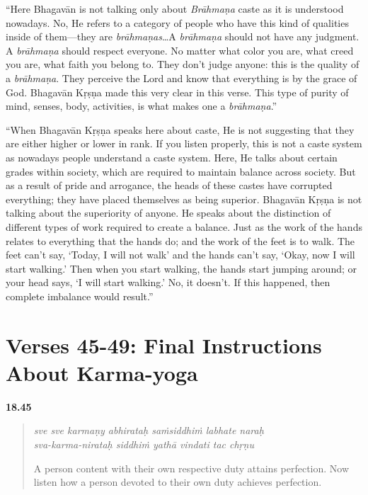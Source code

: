 \enquote{Here Bhagavān is not talking only about \textit{Brāhmaṇa} caste as it is understood nowadays. No, He refers to a category of people who have this kind of qualities inside of them---they are \textit{brāhmaṇas}\ldots A \textit{brāhmaṇa} should not have any judgment. A \textit{brāhmaṇa} should respect everyone. No matter what color you are, what creed you are, what faith you belong to. They don’t judge anyone: this is the quality of a \textit{brāhmaṇa}. They perceive the Lord and know that everything is by the grace of God. Bhagavān Kṛṣṇa made this very clear in this verse. This type of purity of mind, senses, body, activities, is what makes one a \textit{brāhmaṇa}.}

\enquote{When Bhagavān Kṛṣṇa speaks here about caste, He is not suggesting that they are either higher or lower in rank. If you listen properly, this is not a caste system as nowadays people understand a caste system. Here, He talks about certain grades within society, which are required to maintain balance across society. But as a result of pride and arrogance, the heads of these castes have corrupted everything; they have placed themselves as being superior. Bhagavān Kṛṣṇa is not talking about the superiority of anyone. He speaks about the distinction of different types of work required to create a balance. Just as the work of the hands relates to everything that the hands do; and the work of the feet is to walk. The feet can’t say, \enquote{Today, I will not walk} and the hands can’t say, \enquote{Okay, now I will start walking.} Then when you start walking, the hands start jumping around; or your head says, \enquote{I will start walking.} No, it doesn’t. If this happened, then complete imbalance would result.}

\section{Verses 45-49: Final Instructions About Karma-yoga}\label{sec-verses-45-49-final-instructions-about-karma-yoga}

\par\noindent\textbf{18.45}\par
\begin{verse}
\textit{sve sve karmaṇy abhirataḥ saṁsiddhiṁ labhate naraḥ} \\
\textit{sva-karma-nirataḥ siddhiṁ yathā vindati tac chṛṇu}

\noindent A person content with their own respective duty attains perfection. Now listen how a person devoted to their own duty achieves perfection.
\end{verse}
\par



